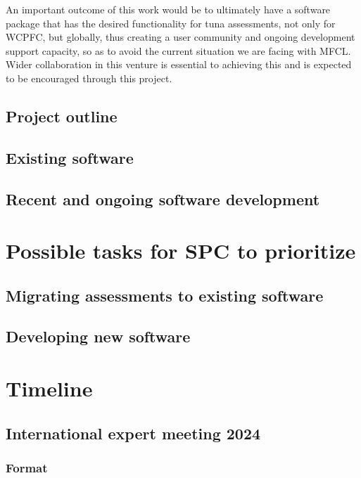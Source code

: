 \documentclass{SCreport}
\begin{document}
An important outcome of this work would be to ultimately have a software package
that has the desired functionality for tuna assessments, not only for WCPFC, but
globally, thus creating a user community and ongoing development support
capacity, so as to avoid the current situation we are facing with MFCL. Wider
collaboration in this venture is essential to achieving this and is expected to
be encouraged through this project.

\subsection{Project outline}

\subsection{Existing software}

\subsection{Recent and ongoing software development}

\section{Possible tasks for SPC to prioritize}

\subsection{Migrating assessments to existing software}

\subsection{Developing new software}

\section{Timeline}

\subsection{International expert meeting 2024}

\subsubsection{Format}
\end{document}
